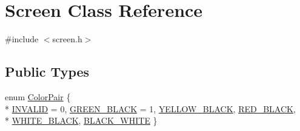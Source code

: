 \hypertarget{classScreen}{\section{Screen Class Reference}
\label{classScreen}
}


{\ttfamily \#include $<$screen.\-h$>$}

\subsection*{Public Types}
\begin{DoxyCompactItemize}
\item 
enum \hyperlink{classScreen_ade5d330a53244ab5e204c9fc2a8ab235}{Color\-Pair} \{ \\*
\hyperlink{classScreen_ade5d330a53244ab5e204c9fc2a8ab235a8f6f59447dce1fb81c648d8674d6b6d2}{I\-N\-V\-A\-L\-I\-D} = 0, 
\hyperlink{classScreen_ade5d330a53244ab5e204c9fc2a8ab235aa979e0b275ebd1d03e934974ac04806a}{G\-R\-E\-E\-N\-\_\-\-B\-L\-A\-C\-K} = 1, 
\hyperlink{classScreen_ade5d330a53244ab5e204c9fc2a8ab235ad296b80c3ff583dfc66fd69be3bfa177}{Y\-E\-L\-L\-O\-W\-\_\-\-B\-L\-A\-C\-K}, 
\hyperlink{classScreen_ade5d330a53244ab5e204c9fc2a8ab235aeb2de5cf606cc15deec28e5ed6d94f1d}{R\-E\-D\-\_\-\-B\-L\-A\-C\-K}, 
\\*
\hyperlink{classScreen_ade5d330a53244ab5e204c9fc2a8ab235a970004d17898edd8718ff21e795b9d39}{W\-H\-I\-T\-E\-\_\-\-B\-L\-A\-C\-K}, 
\hyperlink{classScreen_ade5d330a53244ab5e204c9fc2a8ab235a710df85d2ceefb42c12694fda0682fee}{B\-L\-A\-C\-K\-\_\-\-W\-H\-I\-T\-E}
 \}
\end{DoxyCompactItemize}
